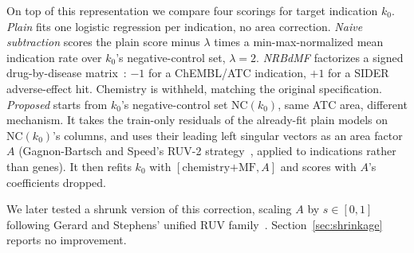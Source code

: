 \documentclass{llncs}
\begin{document}
On top of this representation we compare four scorings for target indication $k_0$. \emph{Plain} fits one logistic regression per indication, no area correction. \emph{Naive subtraction} scores the plain score minus $\lambda$ times a min-max-normalized mean indication rate over $k_0$'s negative-control set, $\lambda=2$. \emph{NRBdMF} factorizes a signed drug-by-disease matrix~\cite{azuma2022nrbdmf}: $-1$ for a ChEMBL/ATC indication, $+1$ for a SIDER adverse-effect hit. Chemistry is withheld, matching the original specification. \emph{Proposed} starts from $k_0$'s negative-control set $\mathrm{NC}(k_0)$, same ATC area, different mechanism. It takes the train-only residuals of the already-fit plain models on $\mathrm{NC}(k_0)$'s columns, and uses their leading left singular vectors as an area factor $A$ (Gagnon-Bartsch and Speed's RUV-2 strategy~\cite{gagnonbartsch2012ruv}, applied to indications rather than genes). It then refits $k_0$ with $[\text{chemistry+MF}, A]$ and scores with $A$'s coefficients dropped.

We later tested a shrunk version of this correction, scaling $A$ by $s\in[0,1]$ following Gerard and Stephens' unified RUV family~\cite{gerard2021ruvstar}. Section~\ref{sec:shrinkage} reports no improvement.
\end{document}
